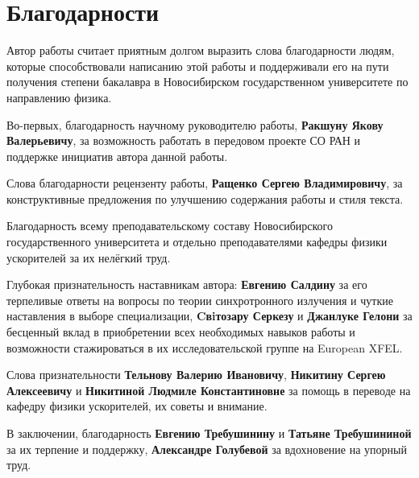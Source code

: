 \chapter*{Благодарности}
Автор работы считает приятным долгом выразить слова благодарности людям, которые способствовали написанию этой работы и поддерживали его на пути получения степени бакалавра в Новосибирском государственном университете по направлению физика.

Во-первых, благодарность научному руководителю работы, \textbf{Ракшуну Якову Валерьевичу}, за возможность работать в передовом проекте СО РАН и поддержке инициатив автора данной работы.

Слова благодарности рецензенту работы, \textbf{Ращенко Сергею Владимировичу}, за конструктивные предложения по улучшению содержания работы и стиля текста.

Благодарность всему преподавательскому составу Новосибирского государственного университета и отдельно преподавателями кафедры физики ускорителей за их нелёгкий труд.

Глубокая признательность наставникам автора: \textbf{Евгению Салдину} за его терпеливые ответы на вопросы по теории синхротронного излучения и чуткие наставления в выборе специализации, \textbf{Cвiтозару Серкезу} и \textbf{Джанлуке Гелони} за бесценный вклад в приобретении всех необходимых навыков работы и возможности стажироваться в их исследовательской группе на European XFEL.

Слова признательности \textbf{Тельнову Валерию Ивановичу}, \textbf{Никитину Сергею Алексеевичу} и \textbf{Никитиной Людмиле Константиновне} за помощь в переводе на кафедру физики ускорителей, их советы и внимание.

В заключении, благодарность \textbf{Евгению Требушинину} и \textbf{Татьяне Требушининой} за их терпение и поддержку, \textbf{Александре Голубевой} за вдохновение на упорный труд.